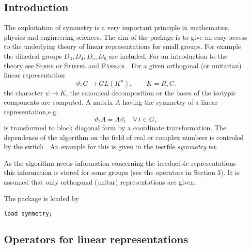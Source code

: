 

\iffalse
This short note describes a package of \REDUCE{} procedures
that compute symmetry-adapted bases and block diagonal forms
of matrices which have the symmetry of a group.
The \package{SYMMETRY} package is the implementation
of the theory of linear representations
for small finite groups such as the dihedral groups.
\fi

\subsection{Introduction}

The exploitation of symmetry is a very important principle in mathematics,
physics and engineering sciences.
The aim of the  package is to give an easy access to the
underlying theory of linear representations for small groups. For
example the
dihedral groups $D_3,D_4,D_5,D_6$ are included.
For an introduction to the theory see \textsc{Serre} \cite{Serre:77} or
\textsc{Stiefel} and \textsc{F\"assler} \cite{StiefelFaessler:79}.
For a given orthogonal (or unitarian) linear representation
\[
\vartheta : G\longrightarrow GL(K^n), \qquad K=R,C.
\]
the character $\psi\rightarrow K$, the
canonical decomposition or the bases of the isotypic
components are computed. A matrix $A$ having the symmetry of a linear
representation,e.g.
\[
\vartheta_t A = A \vartheta_t \quad \forall \, t\in G,
\]
is transformed to block diagonal form by a coordinate
transformation.
The dependence of the algorithm on the
field of real or complex numbers is controled by the switch .
An example for this is given in the testfile \emph{symmetry.tst}.

As the algorithm needs information concerning the irreducible representations
this information is stored for some groups (see the operators in Section 3).
It is assumed that only orthogonal (unitar) representations are given.

The package is loaded by

\texttt{load symmetry;}

\subsection{Operators for linear representations}
\hypertarget{operator:CANONICALDECOMPOSITION}{}
\hypertarget{operator:CHARACTER}{}
\hypertarget{operator:SYMMETRYBASIS}{}
\hypertarget{operator:SYMMETRYBASISPART}{}
\hypertarget{operator:ALLSYMMETRYBASES}{}
\hypertarget{operator:DIAGONALIZE}{}

